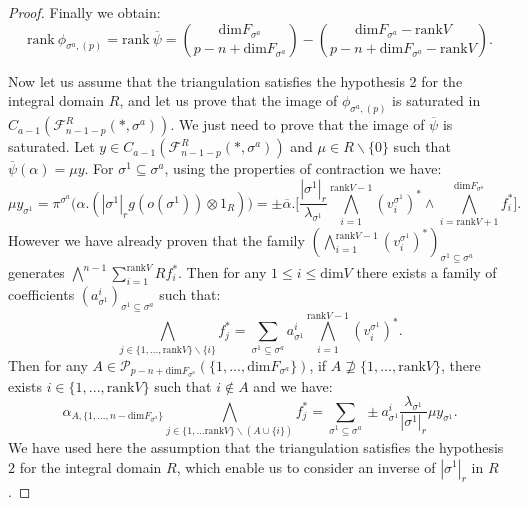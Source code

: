 \documentclass{article}
\begin{document}
\begin{proof}
    Finally we obtain:
    \begin{equation*}
        \mathrm{rank}~ \phi_{\sigma^{a},(p)} = \mathrm{rank} ~\overline{\psi} = \binom{\mathrm{dim}F_{\sigma^a}}{p-n+\mathrm{dim}F_{\sigma^a}}-\binom{\mathrm{dim}F_{\sigma^a}-\mathrm{rank}V}{p-n+\mathrm{dim}F_{\sigma^a}-\mathrm{rank}V}.
    \end{equation*}

    Now let us assume that the triangulation satisfies the hypothesis 2 for the integral domain $R$, and let us prove that the image of $\phi_{\sigma^{a},(p)}$ is saturated in $C_{a-1}(\mathcal{F}_{n-1-p}^R(*,\sigma^a))$. We just need to prove that the image of $\overline{\psi}$ is saturated. Let $y \in C_{a-1}(\mathcal{F}_{n-1-p}^R(*,\sigma^a))$ and $\mu \in R\backslash\{0\}$ such that $\overline{\psi}(\alpha) = \mu y$. For $\sigma^1 \subseteq \sigma^a$, using the properties of contraction we have:
    \begin{equation*}
        \mu y_{\sigma^1} =\pi^{\sigma^a} \Bigg( \alpha.(|\sigma^1|_rg(o(\sigma^1))\otimes1_R) \Bigg)= \pm\overline{\alpha}.\Bigg[\frac{|\sigma^1|_r}{\lambda_{\sigma^1}}\bigwedge_{i=1}^{\mathrm{rank}V -1}(v_i^{\sigma^1})^*\wedge\bigwedge_{i=\mathrm{rank}V+1}^{\mathrm{dim}F_{\sigma^a}} f_i^*\Bigg].
    \end{equation*}
    However we have already proven that the family  $( \bigwedge_{i=1}^{\mathrm{rank}V-1}(v_i^{\sigma^1})^*)_{\sigma^1 \subseteq \sigma^a}$ generates $\bigwedge^{n-1}\sum_{i=1}^{\mathrm{rank}V}Rf_i^*$. Then for any $1 \leq i\leq \mathrm{dim}V$ there exists a family of coefficients $(a^i_{\sigma^1})_{\sigma^1\subseteq \sigma^a}$ such that:
    \begin{equation*}
        \bigwedge_{j\in\{1,...,\mathrm{rank}V\}\backslash\{i\}}f_j^*=\sum_{\sigma^1\subseteq \sigma^a}a^i_{\sigma^1}\bigwedge_{i=1}^{\mathrm{rank}V-1}(v_i^{\sigma^1})^*.
    \end{equation*}
    Then for any $A \in \mathcal{P}_{p-n+\mathrm{dim} F_{\sigma^a}}(\{1,...,\mathrm{dim}F_{\sigma^a}\})$, if $A \not\supseteq\{1,...,\mathrm{rank}V\}$, there exists $i\in\{1,...,\mathrm{rank}V\}$ such that $i\not\in A$ and we have:
    \begin{equation*}
        \alpha_{A,\{1,...,n-\mathrm{dim}F_{\sigma^a}\}} \bigwedge_{j\in\{1,...\mathrm{rank}V\}\backslash(A\cup\{i\})}f_j^* = \sum_{\sigma^1\subseteq \sigma^a}\pm a^i_{\sigma^1}\frac{\lambda_{\sigma^1}}{|\sigma^1|_r} \mu y_{\sigma^1}.
    \end{equation*}
    We have used here the assumption that the triangulation satisfies the hypothesis $2$ for the integral domain $R$, which enable us to consider an inverse of $|\sigma^1|_r$ in $R$.
    

\end{proof}
\end{document}
